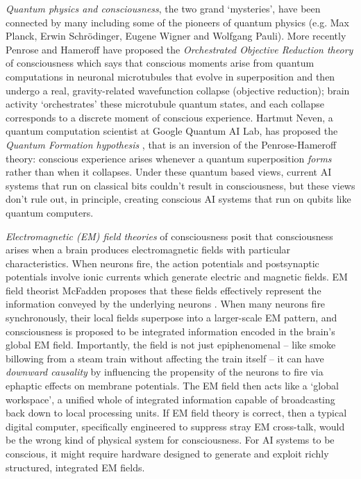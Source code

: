 \documentclass[11pt, a4paper, onecolumn, gdm]{google}
\begin{document}
\emph{Quantum physics and consciousness}, the two grand `mysteries', have been connected by many including some of the pioneers of quantum physics (e.g. Max Planck, Erwin Schrödinger, Eugene Wigner and Wolfgang Pauli).
More recently Penrose and Hameroff have proposed the \emph{Orchestrated Objective Reduction theory} of consciousness \citep{hameroff2014} which says that conscious moments arise from quantum computations in neuronal microtubules that evolve in superposition and then undergo a real, gravity-related wavefunction collapse (objective reduction); brain activity `orchestrates' these microtubule quantum states, and each collapse corresponds to a discrete moment of conscious experience.
Hartmut Neven, a quantum computation scientist at Google Quantum AI Lab, has proposed the \emph{Quantum Formation hypothesis} \citep{neven2024}, that is an inversion of the Penrose-Hameroff theory: conscious experience arises whenever a quantum superposition \emph{forms} rather than when it collapses.
Under these quantum based views, current AI systems that run on classical bits couldn't result in consciousness, but these views don't rule out, in principle, creating conscious AI systems that run on qubits like quantum computers.

\emph{Electromagnetic (EM) field theories} of consciousness posit that consciousness arises when a brain produces electromagnetic fields with particular characteristics.
When neurons fire, the action potentials and postsynaptic potentials involve ionic currents which generate electric and magnetic fields.
EM field theorist McFadden proposes that these fields effectively represent the information conveyed by the underlying neurons \citep{mcfadden2020}.
When many neurons fire synchronously, their local fields superpose into a larger-scale EM pattern, and consciousness is proposed to be integrated information encoded in the brain's global EM field.
Importantly, the field is not just epiphenomenal -- like smoke billowing from a steam train without affecting the train itself -- it can have \emph{downward causality} by influencing the propensity of the neurons to fire via ephaptic effects on membrane potentials.
The EM field then acts like a `global workspace', a unified whole of integrated information capable of broadcasting back down to local processing units.
If EM field theory is correct, then a typical digital computer, specifically engineered to suppress stray EM cross-talk, would be the wrong kind of physical system for consciousness.
For AI systems to be conscious, it might require hardware designed to generate and exploit richly structured, integrated EM fields.
\end{document}
